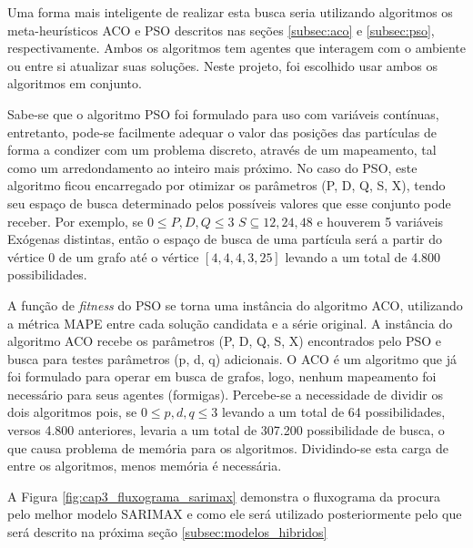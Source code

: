Uma forma mais inteligente de realizar esta busca seria utilizando algoritmos os meta-heurísticos ACO e PSO descritos nas seções \ref{subsec:aco} e \ref{subsec:pso}, respectivamente. Ambos os algoritmos tem agentes que interagem com o ambiente ou entre si atualizar suas soluções. Neste projeto, foi escolhido usar ambos os algoritmos em conjunto.

Sabe-se que o algoritmo PSO foi formulado para uso com variáveis contínuas, entretanto, pode-se facilmente adequar o valor das posições das partículas de forma a condizer com um problema discreto, através de um mapeamento, tal como um arredondamento ao inteiro mais próximo. No caso do PSO, este algoritmo ficou encarregado por otimizar os parâmetros (P, D, Q, S, X), tendo seu espaço de busca determinado pelos possíveis valores que esse conjunto pode receber. Por exemplo, se $ 0 \leq P,D,Q \leq 3 $ $S \subseteq {12, 24, 48}$ e houverem 5 variáveis Exógenas distintas, então o espaço de busca de uma partícula será a partir do vértice 0 de um grafo até o vértice $[4, 4, 4, 3, 25]$ levando a um total de 4.800 possibilidades.

A função de \textit{fitness} do PSO se torna uma instância do algoritmo ACO, utilizando a métrica MAPE entre cada solução candidata e a série original. A instância do algoritmo ACO recebe os parâmetros (P, D, Q, S, X) encontrados pelo PSO e busca para testes parâmetros (p, d, q) adicionais. O ACO é um algoritmo que já foi formulado para operar em busca de grafos, logo, nenhum mapeamento foi necessário para seus agentes (formigas). Percebe-se a necessidade de dividir os dois algoritmos pois, se $ 0 \leq p,d,q \leq 3 $ levando a um total de 64 possibilidades, versos 4.800 anteriores, levaria a um total de 307.200 possibilidade de busca, o que causa problema de memória para os algoritmos. Dividindo-se esta carga de entre os algoritmos, menos memória é necessária.

A Figura \ref{fig:cap3_fluxograma_sarimax} demonstra o fluxograma da procura pelo melhor modelo SARIMAX e como ele será utilizado posteriormente pelo que será descrito na próxima seção \ref{subsec:modelos_hibridos}

